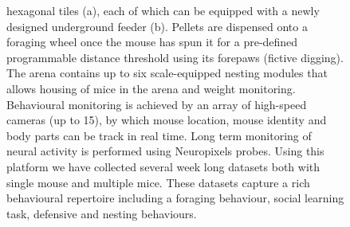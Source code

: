 \begin{figure}
{    hexagonal tiles (a), each of which can be equipped with a newly designed
    underground feeder (b).
    Pellets are dispensed onto a foraging wheel once the mouse has spun it for
    a pre-defined programmable distance threshold using its forepaws (fictive
    digging).
    The arena contains up to six scale-equipped nesting modules that allows
    housing of mice in the arena and weight monitoring.
    Behavioural monitoring is achieved by an array of high-speed cameras (up to
    15), by which mouse location, mouse identity and body parts can be track in
    real time.
    Long term monitoring of neural activity is performed using Neuropixels
    probes.
    Using this platform we have collected several week long datasets both with
    single mouse and multiple mice.
    These datasets capture a rich behavioural repertoire including a foraging
    behaviour,  social learning task, defensive and nesting behaviours.
    }
    \label{fig:arena}
\end{figure}
